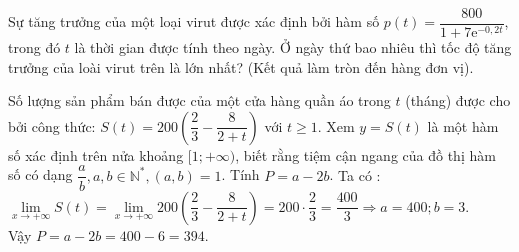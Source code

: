 \begin{ex}%
	Sự tăng trưởng của một loại virut được xác định bởi hàm số $p(t)=\dfrac{800}{1+7\mathrm{e}^{-0{,}2t}}$, trong đó $t$ là thời gian được tính theo ngày. Ở ngày thứ bao nhiêu thì tốc độ tăng trưởng của loài virut trên là lớn nhất? (Kết quả làm tròn đến hàng đơn vị).
\end{ex}

\begin{ex}%
	Số lượng sản phẩm bán được của một cửa hàng quần áo trong $t$ (tháng) được cho bởi công thức: $S(t)=200\left(\dfrac{2}{3}-\dfrac{8}{2+t}\right)$ với $t \geq 1$. Xem $y=S(t)$ là một hàm số xác định trên nửa khoảng $[1 ;+\infty)$, biết rằng tiệm cận ngang của đồ thị hàm số có dạng $\dfrac{a}{b}, a, b \in \mathbb{N}^*,(a, b)=1$. Tính $P=a-2 b$.
	\loigiai
	{Ta có : $\lim\limits _{x \rightarrow+\infty} S(t)=\lim\limits _{x \rightarrow+\infty} 200\left(\dfrac{2}{3}-\dfrac{8}{2+t}\right)=200 \cdot \dfrac{2}{3}=\dfrac{400}{3} \Rightarrow a=400 ; b=3$.\\
		Vậy $P=a-2 b=400-6=394$.
	}
\end{ex}

